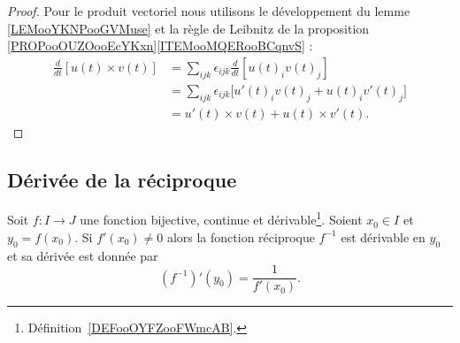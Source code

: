 \begin{proof}
	Pour le produit vectoriel nous utilisons le développement du lemme \ref{LEMooYKNPooGVMuse} et la règle de Leibnitz de la proposition \ref{PROPooOUZOooEcYKxn}\ref{ITEMooMQERooBCqnvS} :
	\begin{subequations}
		\begin{align}
			\frac{d}{dt} \left[  u(t)\times v(t) \right] & = \sum_{ijk}\epsilon_{ijk}\frac{d}{dt} \left[ u(t)_iv(t)_j  \right] \\
			                                             & = \sum_{ijk}\epsilon_{ijk}\big[   u'(t)_iv(t)_j+u(t)_iv'(t)_j \big] \\
			                                             & = u'(t)\times v(t)+u(t)\times v'(t).
		\end{align}
	\end{subequations}
\end{proof}


\subsection{Dérivée de la réciproque}

\begin{proposition} \label{PropMRBooXnnDLq}
	Soit \( f\colon I\to J\) une fonction bijective, continue et dérivable\footnote{Définition~\ref{DEFooOYFZooFWmcAB}.}. Soient \( x_0\in I\) et \( y_0=f(x_0)\). Si \( f'(x_0)\neq 0\) alors la fonction réciproque \( f^{-1}\) est dérivable en \( y_0\) et sa dérivée est donnée par
	\begin{equation}        \label{EQooXGJEooSRaQBe}
		(f^{-1})'(y_0)=\frac{1}{ f'(x_0) }.
	\end{equation}
\end{proposition}

